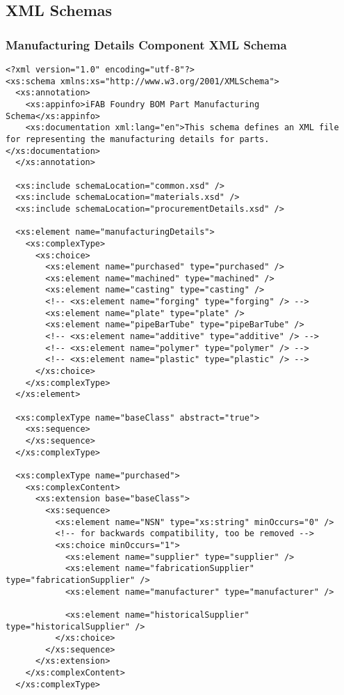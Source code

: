\subsection{XML Schemas}
\subsubsection{Manufacturing Details Component XML Schema}
\lstset{language=XML}
\begin{lstlisting}
<?xml version="1.0" encoding="utf-8"?>
<xs:schema xmlns:xs="http://www.w3.org/2001/XMLSchema">
  <xs:annotation>
    <xs:appinfo>iFAB Foundry BOM Part Manufacturing Schema</xs:appinfo>
    <xs:documentation xml:lang="en">This schema defines an XML file for representing the manufacturing details for parts.</xs:documentation>
  </xs:annotation>

  <xs:include schemaLocation="common.xsd" />
  <xs:include schemaLocation="materials.xsd" />
  <xs:include schemaLocation="procurementDetails.xsd" />

  <xs:element name="manufacturingDetails">
    <xs:complexType>
      <xs:choice>
        <xs:element name="purchased" type="purchased" />
        <xs:element name="machined" type="machined" />
        <xs:element name="casting" type="casting" />
        <!-- <xs:element name="forging" type="forging" /> -->
        <xs:element name="plate" type="plate" />
        <xs:element name="pipeBarTube" type="pipeBarTube" />
        <!-- <xs:element name="additive" type="additive" /> -->
        <!-- <xs:element name="polymer" type="polymer" /> -->
        <!-- <xs:element name="plastic" type="plastic" /> -->
      </xs:choice>
    </xs:complexType>
  </xs:element>

  <xs:complexType name="baseClass" abstract="true">
    <xs:sequence>
    </xs:sequence>
  </xs:complexType>

  <xs:complexType name="purchased">
    <xs:complexContent>
      <xs:extension base="baseClass">
        <xs:sequence>
          <xs:element name="NSN" type="xs:string" minOccurs="0" />
          <!-- for backwards compatibility, too be removed -->
          <xs:choice minOccurs="1">
            <xs:element name="supplier" type="supplier" />
            <xs:element name="fabricationSupplier" type="fabricationSupplier" />
            <xs:element name="manufacturer" type="manufacturer" />

            <xs:element name="historicalSupplier" type="historicalSupplier" />
          </xs:choice>
        </xs:sequence>
      </xs:extension>
    </xs:complexContent>
  </xs:complexType>


\end{lstlisting}
